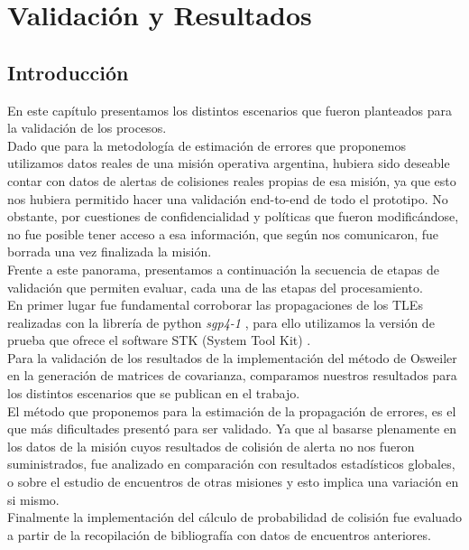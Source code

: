 \chapter{Validaci\'on y Resultados}
\label{chap:resultados}


\section{Introducci\'on}
En este cap\'itulo presentamos los distintos escenarios que fueron planteados para la validaci\'on de los procesos.\\
Dado que para la metodolog\'ia de estimaci\'on de errores que proponemos utilizamos datos reales de una misi\'on operativa argentina, hubiera sido
deseable contar con datos de alertas de colisiones reales propias de esa misi\'on, ya que esto nos hubiera permitido hacer una validaci\'on end-to-end de todo el prototipo. No obstante, por cuestiones de confidencialidad y pol\'iticas que fueron modific\'andose, no fue posible tener acceso a esa informaci\'on, que seg\'un nos comunicaron, fue borrada una vez finalizada la misi\'on.\\
Frente a este panorama, presentamos a continuaci\'on la secuencia de etapas de validaci\'on que permiten evaluar, cada una de las etapas del procesamiento.\\

En primer lugar fue fundamental corroborar las propagaciones de los TLEs realizadas con la librer\'ia de python {\it{sgp4-1}} \citep{sgp4python}, para ello utilizamos la versi\'on de prueba que ofrece el software STK (System Tool Kit) \citep{stk}.\\
Para la validaci\'on de los resultados de la implementaci\'on del m\'etodo de Osweiler en la generaci\'on de matrices de covarianza, comparamos nuestros resultados para los distintos escenarios que se publican en el trabajo.\\

El m\'etodo que proponemos para la estimaci\'on de la propagaci\'on de errores, es el que m\'as dificultades present\'o para ser validado. Ya que al basarse plenamente en los datos de la misi\'on cuyos resultados de colisi\'on de alerta no nos fueron suministrados, fue analizado en comparaci\'on con resultados estad\'isticos globales, o sobre el estudio de encuentros de otras misiones y esto implica una variaci\'on en si mismo.\\

Finalmente la implementaci\'on del c\'alculo de probabilidad de colisi\'on fue evaluado a partir de la recopilaci\'on de bibliograf\'ia con datos de encuentros anteriores.\\

